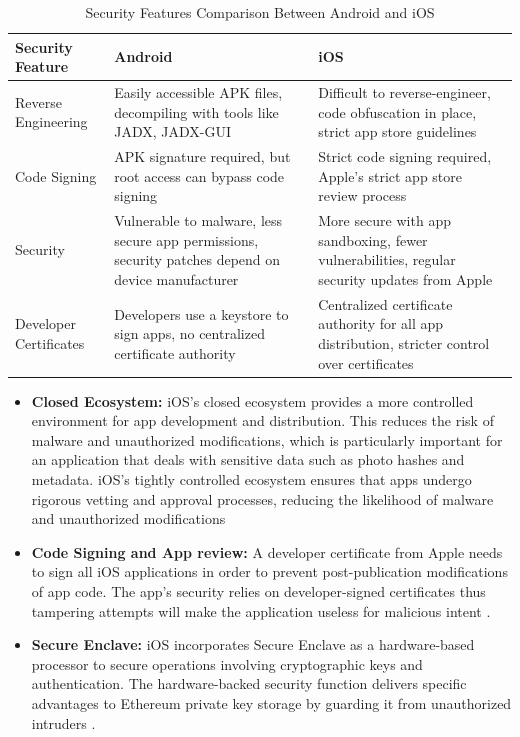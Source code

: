 \begin{table}[bt]
    \centering
    \begin{tabularx}{\textwidth}{|X|X|X|}
    \hline
    \textbf{Security Feature}  & \textbf{Android}  & \textbf{iOS} \\ \hline
    Reverse Engineering        & Easily accessible APK files, decompiling with tools like JADX, JADX-GUI  & Difficult to reverse-engineer, code obfuscation in place, strict app store guidelines \\ \hline
    Code Signing               & APK signature required, but root access can bypass code signing & Strict code signing required, Apple’s strict app store review process \\ \hline
    Security                   & Vulnerable to malware, less secure app permissions, security patches depend on device manufacturer & More secure with app sandboxing, fewer vulnerabilities, regular security updates from Apple \\ \hline
    Developer Certificates     & Developers use a keystore to sign apps, no centralized certificate authority & Centralized certificate authority for all app distribution, stricter control over certificates \\ \hline
    \end{tabularx}
    \caption{Security Features Comparison Between Android and iOS}
    \label{tab:securityFeatures}
\end{table}

\begin{itemize}
    \item {\textbf{Closed Ecosystem:}} iOS's closed ecosystem provides a more controlled environment for app development and distribution. This reduces the risk of malware and unauthorized modifications, which is particularly important for an application that deals with sensitive data such as photo hashes and metadata. iOS’s tightly controlled ecosystem ensures that apps undergo rigorous vetting and approval processes, reducing the likelihood of malware and unauthorized modifications \cite{iosSecGarg}
    \item {\textbf{Code Signing and App review:}} A developer certificate from Apple needs to sign all iOS applications in order to prevent post-publication modifications of app code. The app's security relies on developer-signed certificates thus tampering attempts will make the application useless for malicious intent \cite{devCert}.
    \item {\textbf{Secure Enclave:}} iOS incorporates Secure Enclave as a hardware-based processor to secure operations involving cryptographic keys and authentication. The hardware-backed security function delivers specific advantages to Ethereum private key storage by guarding it from unauthorized intruders \cite{SecureEnclave2024}.
\end{itemize}




